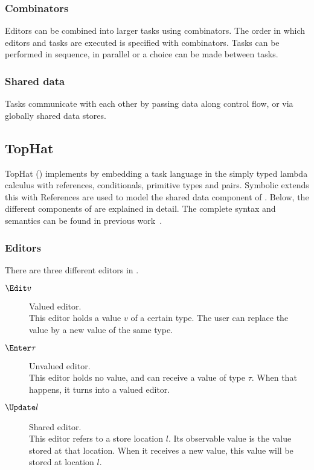 \subsubsection{Combinators}

  Editors can be combined into larger tasks using combinators.
  The order in which editors and tasks are executed is specified with combinators. Tasks can be performed in sequence, in parallel or a choice can be made between tasks.


\subsubsection{Shared data}

 Tasks communicate with each other by passing data along control flow, or via globally shared data stores.



%
%


\subsection{TopHat}

TopHat (\TOPHAT) implements \TOP by embedding a task language in the simply typed lambda calculus with references, conditionals, primitive types and pairs.
Symbolic \TOPHAT extends this with 
References are used to model the shared data component of \TOP.
Below, the different components of \TOPHAT are explained in detail.
The complete syntax and semantics can be found in previous work~\cite{Steenvoorden2019}.


\subsubsection{Editors}

There are three different editors in \TOPHAT.
\begin{description}
  \item[$\Edit v$] Valued editor.\\
    This editor holds a value $v$ of a certain type.
    The user can replace the value by a new value of the same type.
  \item[$\Enter \tau$] Unvalued editor.\\
    This editor holds no value, and can receive a value of type $\tau$.
    When that happens, it turns into a valued editor.
  \item[$\Update l$] Shared editor.\\
    This editor refers to a store location $l$.
    Its observable value is the value stored at that location.
    When it receives a new value, this value will be stored at location $l$.
\end{description}


